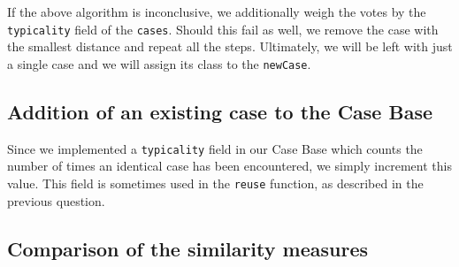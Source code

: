 \documentclass[a4paper]{article}
\begin{document}
If the above algorithm is inconclusive, we additionally weigh the votes by the \texttt{typicality} field of the \texttt{cases}. Should this fail as well, we remove the case with the smallest distance and repeat all the steps. Ultimately, we will be left with just a single case and we will assign its class to the \texttt{newCase}.

\subsection{Addition of an existing case to the Case Base}

Since we implemented a \texttt{typicality} field in our Case Base which counts the number of times an identical case has been encountered, we simply increment this value. This field is sometimes used in the \texttt{reuse} function, as described in the previous question.

\subsection{Comparison of the similarity measures}
\end{document}
